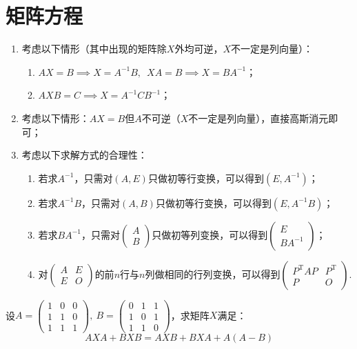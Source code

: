 \section{矩阵方程}
\begin{enumerate}
    \item 考虑以下情形（其中出现的矩阵除$X$外均可逆，$X$不一定是列向量）：
    \begin{enumerate}[label=(\arabic*)]
        \item $AX=B \implies X=A^{-1}B, \enspace XA=B \implies X=BA^{-1}$；
        \item $AXB=C \implies X=A^{-1}CB^{-1}$；
    \end{enumerate}
    \item 考虑以下情形：$AX=B$但$A$不可逆（$X$不一定是列向量），直接高斯消元即可；
    \item 考虑以下求解方式的合理性：
    \begin{enumerate}[label=(\arabic*)]
        \item 若求$A^{-1}$，只需对$(A,E)$只做初等行变换，可以得到$(E,A^{-1})$；
        \item 若求$A^{-1}B$，只需对$(A,B)$只做初等行变换，可以得到$(E,A^{-1}B)$；
        \item 若求$BA^{-1}$，只需对$\begin{pmatrix}
            A \\ B
        \end{pmatrix}$只做初等列变换，可以得到$\begin{pmatrix}
            E \\ BA^{-1}
        \end{pmatrix}$；
        \item 对$\begin{pmatrix}
            A & E \\ E & O
        \end{pmatrix}$的前$n$行与$n$列做相同的行列变换，可以得到$\begin{pmatrix}
            P^\mathrm{T}AP & P^\mathrm{T} \\ P & O
        \end{pmatrix}$.
    \end{enumerate}
\end{enumerate}

\begin{example}
    设$A=\begin{pmatrix}1 & 0 & 0 \\ 1 & 1 & 0 \\ 1 & 1 & 1\end{pmatrix},\
    B=\begin{pmatrix}0 & 1 & 1 \\ 1 & 0 & 1 \\ 1 & 1 & 0\end{pmatrix}$，求矩阵$X$满足：
    \[AXA+BXB=AXB+BXA+A(A-B)\]
\end{example}

